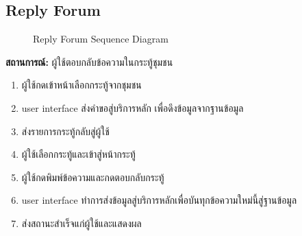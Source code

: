 \subsection{Reply Forum}
\begin{figure}[H]\centering
    \setlength{\fboxrule}{0.2mm} %
    \caption{Reply Forum Sequence Diagram}\label{fig:ReplyForumSeqDiagram}
\end{figure}
\textbf{สถานการณ์: }ผู้ใช้ตอบกลับข้อความในกระทู้ชุมชน
\begin{enumerate}
    \item ผู้ใช้กดเข้าหน้าเลือกกระทู้จากชุมชน
    \item user interface ส่งคำขอสู่บริการหลัก เพื่อดึงข้อมูลจากฐานข้อมูล
    \item ส่งรายการกระทู้กลับสู่ผู้ใช้
    \item ผู้ใช้เลือกกระทู้และเข้าสู่หน้ากระทู้
    \item ผู้ใช้กดพิมพ์ข้อความและกดตอบกลับกระทู้
    \item user interface ทำการส่งข้อมูลสู่บริการหลักเพื่อบันทุกข้อความใหม่นี้สู่ฐานข้อมูล
    \item ส่งสถานะสำเร็จแก่ผู้ใช้และแสดงผล
\end{enumerate}


